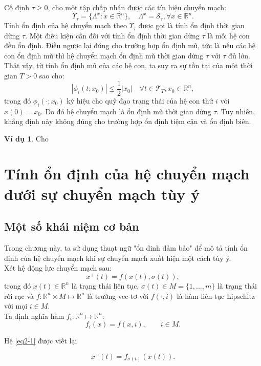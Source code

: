\documentclass[14pt,a4paper,oneside]{report}		%
\theoremstyle{definition}
\newtheorem{example}[theorem]{Ví dụ}
\begin{document}
Cố định $\tau \geq 0$, cho một tập chấp nhận được các tín hiệu chuyển mạch:
$$\Upsilon_\tau=\{\Lambda^x:x\in\mathbb{R}^n\},\quad \Lambda^x=\mathcal{S}_\tau,\forall x\in\mathbb{R}^n.$$
Tính ổn định của hệ chuyển mạch theo $\Upsilon_\tau$ được gọi là tính ổn định thời gian dừng $\tau$. Một điều kiện cần đối với tính ổn định thời gian dừng $\tau$ là mỗi hệ con đều ổn định. Điều ngược lại đúng cho trường hợp ổn định mũ, tức là nếu các hệ con ổn định mũ thì hệ chuyển mạch ổn định mũ thời gian dừng $\tau$ với $\tau$ đủ lớn. Thật vậy, từ tính ổn định mũ của các hệ con, ta suy ra sự tồn tại của một thời gian $T>0$ sao cho:
$$|\phi_i(t;x_0)|\leq\frac{1}{2}|x_0|\quad\forall t\in\mathcal{T}_T,x_0\in\mathbb{R}^n,$$
trong đó $\phi_i(\cdot;x_0)$ ký hiệu cho quỹ đạo trạng thái của hệ con thứ $i$ với $x(0) = x_0$. Do đó hệ chuyển mạch là ổn định mũ thời gian dừng $\tau$. Tuy nhiên, khẳng định này không đúng cho trường hợp ổn định tiệm cận và ổn định biên.

\begin{example}
Cho 
\end{example}

\chapter{Tính ổn định của hệ chuyển mạch dưới sự chuyển mạch tùy ý}
\section{Một số khái niệm cơ bản}
Trong chương này, ta sử dụng thuạt ngữ "ổn đinh đảm bảo" để mô tả tính ổn định của hệ chuyển mạch khi sự chuyển mạch xuất hiện một cách tùy ý.\\

Xét hệ động lực chuyển mạch sau:
\begin{equation} \label{eq2-1}
x^+(t)=f(x(t),\sigma (t)),
\end{equation}
trong đó $x(t)\in\mathbb{R}^n$ là trạng thái liên tục, $\sigma (t)\in M = \{1,...,m\}$ là trạng thái rời rạc và $f : \mathbb{R}^n \times M \mapsto \mathbb{R}^n$ là trường vec-tơ với $f(\cdot ,i)$ là hàm liên tục Lipschitz với mọi $i\in M$.\\

Ta định nghĩa hàm $f_i : \mathbb{R}^n \mapsto \mathbb{R}^n$:
$$f_i(x)=f(x,i), \qquad i\in M.$$

Hệ \ref{eq2-1} được viết lại

\begin{equation} \label{eq2-2}
x^+(t)=f_{\sigma (t)}(x(t)).
\end{equation}
\end{document}
